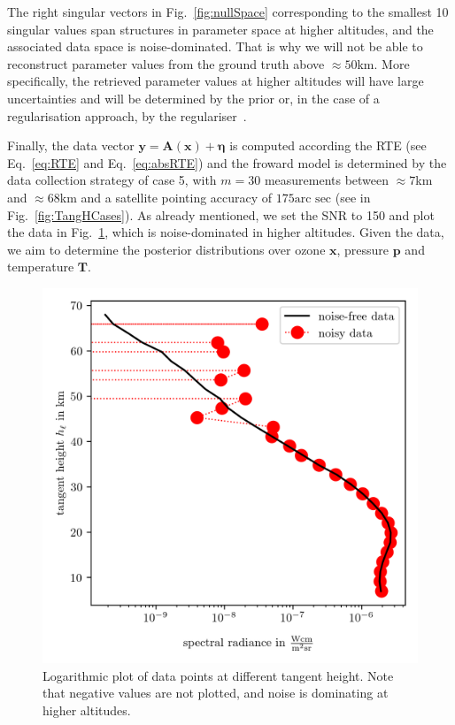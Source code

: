 The right singular vectors in Fig.~\ref{fig:nullSpace} corresponding to the smallest 10 singular values span structures in parameter space at higher altitudes, and the associated data space is noise-dominated.
That is why we will not be able to reconstruct parameter values from the ground truth above $\approx50$km.
More specifically, the retrieved parameter values at higher altitudes will have large uncertainties and will be determined by the prior or, in the case of a regularisation approach, by the regulariser~\cite{tan2016LecNot}.
\clearpage


Finally, the data vector $\bm{y} = \bm{A}(\bm{x}) + \bm{\eta} $ is computed according the RTE (see Eq.~\ref{eq:RTE} and Eq.~\ref{eq:absRTE}) and the froward model is determined by the data collection strategy of case 5, with $m = 30$ measurements between $\approx 7$km and $\approx 68$km and a satellite pointing accuracy of $175\text{arc sec}$ (see in Fig.~\ref{fig:TangHCases}).
As already mentioned, we set the SNR to 150 and plot the data in Fig.~\ref{fig:DataPlot}, which is noise-dominated in higher altitudes.
Given the data, we aim to determine the posterior distributions over ozone $\bm{x}$, pressure $\bm{p}$ and temperature $\bm{T}$.
\begin{figure}[h!]
	\centering
	\includegraphics{DataPlot.png}
	\caption[Logarithmic plot of the data points at different tangent height.]{Logarithmic plot of data points at different tangent height. Note that negative values are not plotted, and noise is dominating at higher altitudes.}
	\label{fig:DataPlot}
\end{figure}
\clearpage
